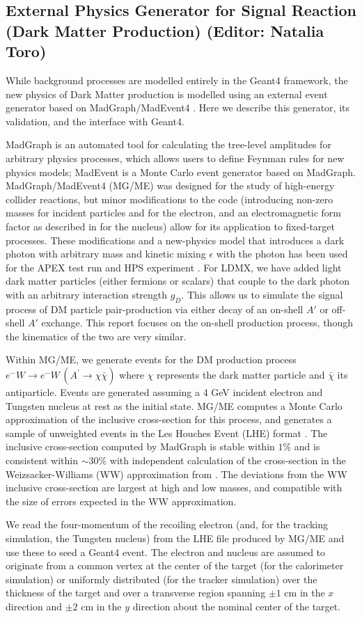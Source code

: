 
\subsection{External Physics Generator for Signal Reaction (Dark Matter Production) (Editor: Natalia Toro)}
\label{ssec:signal}
While background processes are modelled entirely in the Geant4 framework, the new physics of Dark Matter production is modelled using an external event generator based on MadGraph/MadEvent4 \cite{MG4}.  Here we describe this generator, its validation, and the interface with Geant4.

MadGraph is an automated tool for calculating the tree-level amplitudes for arbitrary physics processes, which allows users to define Feynman rules for new physics models; MadEvent is a Monte Carlo event generator based on MadGraph.  MadGraph/MadEvent4 (MG/ME) was designed for the study of high-energy collider reactions, but minor modifications to the code (introducing non-zero masses for incident particles and for the electron, and an electromagnetic form factor as described in \cite{Tsai} for the nucleus) allow for its application to fixed-target processes.  These modifications and a new-physics model that introduces a dark photon with arbitrary mass and kinetic mixing $\epsilon$ with the photon has been used for  the APEX test run \cite{APEXtest} and HPS experiment \cite{HPStest}.  For LDMX, we have added light dark matter particles (either fermions or scalars) that couple to the dark photon with an arbitrary interaction strength $g_D$.  This allows us to simulate the signal process of DM particle pair-production via either decay of an on-shell $A'$ or off-shell $A'$ exchange.   This report focuses on the on-shell production process, though the kinematics of the two are very similar.  

Within MG/ME, we generate events for the DM production process $e^- W \rightarrow e^- W \,(A^\prime \rightarrow \chi \bar\chi)$ where $\chi$ represents the dark matter particle and $\bar\chi$ its antiparticle. Events are generated assuming a 4 GeV incident electron and Tungsten nucleus at rest as the initial state.  MG/ME computes a Monte Carlo approximation of the inclusive cross-section for this process, and generates a sample of unweighted events in the Les Houches Event (LHE) format \cite{LHE}.  The inclusive cross-section computed by MadGraph is stable within $1\%$ and is consistent within $\sim 30\%$ with independent calculation of the cross-section in the Weizsacker-Williams (WW) approximation from \cite{Andreas09}.  The deviations from the WW inclusive cross-section are largest at high and low masses, and compatible with the size of errors expected in the WW approximation.

We read the four-momentum of the recoiling electron (and, for the tracking simulation, the Tungsten nucleus) from the LHE file produced by MG/ME and use these to seed a Geant4 event.  The electron and nucleus are assumed to originate from a common vertex at the center of the target (for the calorimeter simulation) or uniformly distributed (for the tracker simulation) over the thickness of the target and over a transverse region spanning $\pm 1$ cm in the $x$ direction and $\pm 2$ cm in the $y$ direction about the nominal center of the target.

